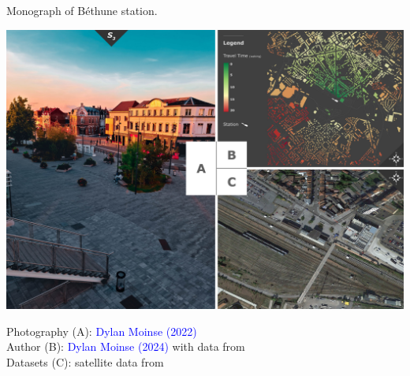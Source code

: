 \begin{refsegment}
\begin{carte}[h!]\vspace*{4pt}
    \caption{Monograph of Béthune station.}
    \label{fig-chap3:monographie-bethune}
    \centerline{\includegraphics[height=.35\pageheight]{src/Figures/Chap-3/EN_Gare_Bethune.jpg}}
    \vspace{5pt}
    \begin{flushright}\scriptsize{
    Photography (A): \textcolor{blue}{Dylan Moinse (2022)}
    \\
    Author (B): \textcolor{blue}{Dylan Moinse (2024)} with data from \textcolor{blue}{\textcite{openstreetmap_openstreetmap_2023}}
    \\
    Datasets (C): satellite data from \textcolor{blue}{\textcite{google_earth_google_2023}}
    }\end{flushright}
\end{carte}


\end{refsegment}
